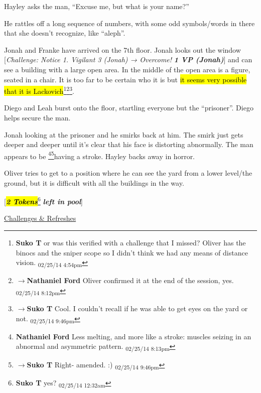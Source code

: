 Hayley asks the man, ``Excuse me, but what is your name?''

He rattles off a long sequence of numbers, with some odd symbols/words in there that she doesn't recognize, like ``aleph''.  



Jonah and Franke have arrived on the 7th floor.  Jonah looks out the window {[}\textit{Challenge: Notice 1. Vigilant 3 (Jonah)  → Overcome! }\textit{\textbf{1 VP (Jonah)}}{]} and can see a building with a large open area.  In the middle of the open area is a figure, seated in a chair.  It is too far to be certain who it is but \hl{it seems very possible that it is Lackovich}\footnote{\textbf{Suko T }or was this verified with a challenge that I missed?  Oliver has the binocs and the sniper scope so I didn't think we had any means of distance vision. \textsubscript{02/25/14 4:54pm}}\footnote{$\rightarrow$\textbf{Nathaniel Ford }Oliver confirmed it at the end of the session, yes. \textsubscript{02/25/14 8:12pm}}\footnote{$\rightarrow$\textbf{Suko T }Cool.  I couldn't recall if he was able to get eyes on the yard or not. \textsubscript{02/25/14 9:46pm}}.



Diego and Leah burst onto the floor, startling everyone but the ``prisoner''.  Diego helps secure the man.



Jonah looking at the prisoner and he smirks back at him.  The smirk just gets deeper and deeper until it's clear that his face is distorting abnormally.  The man appears to be \footnote{\textbf{Nathaniel Ford }Less melting, and more like a stroke: muscles seizing in an abnormal and asymmetric pattern. \textsubscript{02/25/14 8:13pm}}\footnote{$\rightarrow$\textbf{Suko T }Right- amended. :) \textsubscript{02/25/14 9:46pm}}having a stroke.  Hayley backs away in horror.



Oliver tries to get to a position where he can see the yard from a lower level/the ground, but it is difficult with all the buildings in the way.



{[}\textit{\textbf{\hl{2 Tokens}}}\footnote{\textbf{Suko T }yes? \textsubscript{02/25/14 12:32am}}\textit{\textbf{ left in pool}}{]}





\underline{  {\LARGE Challenges \& Refreshes }  }



